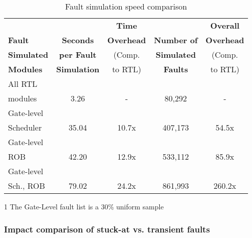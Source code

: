 \documentclass[12pt]{yalephd}
\begin{document}
\begin{table}[!ht]
\centering
\begin{threeparttable}[b]
\caption{Fault simulation speed comparison}\label{sC2Simulation speed}
\begin{tabular}{||l|c|c|c|c||}
\hline
\hline
                &                  & {\bf Time}     & {\bf }          & {\bf Overall} \\
{\bf Fault}     & {\bf Seconds }   & {\bf Overhead} & {\bf Number of} & {\bf Overhead} \\
{\bf Simulated} & {\bf per Fault}  & {(Comp.}       & {\bf Simulated} & {(Comp.}  \\
{\bf Modules}   & {\bf Simulation} & { to RTL)}     & {\bf Faults\tnote{1} }   & { to RTL)}  \\

\hline
All RTL    &       &       &         &        \\
modules    & 3.26  & -     & 80,292  & -      \\
\hline
Gate-level &       &       &         &        \\
Scheduler  & 35.04 & 10.7x & 407,173 & 54.5x  \\
\hline
Gate-level &       &       &         &        \\
ROB        & 42.20 & 12.9x & 533,112 & 85.9x  \\
\hline
Gate-level &       &       &         &        \\
Sch., ROB  & 79.02 & 24.2x & 861,993 & 260.2x \\

\hline
\hline
\end{tabular}
  \begin{tablenotes}
    \item[1] The Gate-Level fault list is a 30\% uniform sample
  \end{tablenotes}
\end{threeparttable}
\end{table}

\subsubsection{Impact comparison of stuck-at vs. transient faults}
\end{document}
